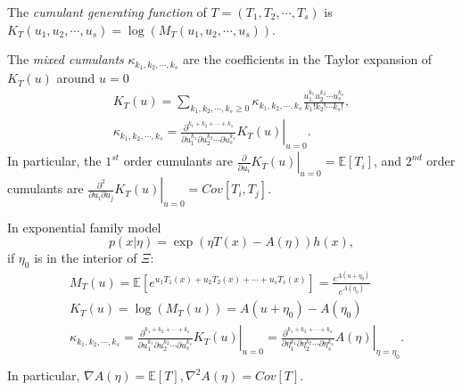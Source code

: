\documentclass[a4paper]{article}
\begin{document}
\begin{defi}
	The \emph{cumulant generating function} of $T = (T_1,T_2, \cdots, T_s)$ is $K_T(u_1, u_2, \cdots, u_s) = \log(M_T(u_1, u_2, \cdots, u_s))$. 
\end{defi}

\begin{prop}
	The \emph{mixed cumulants} $\kappa_{k_1, k_2, \cdots, k_s}$ are the coefficients in the Taylor expansion of $K_T(u)$ around $u = 0$
	\begin{equation}
		\begin{aligned}
			K_T(u) = \sum\limits_{k_1, k_2, \cdots, k_s \geq 0} \kappa_{k_1, k_2, \cdots, k_s} \frac{u_1^{k_1} u_2^{k_2} \cdots u_s^{k_s}}{k_1! k_2! \cdots k_s!}, \\
			\kappa_{k_1, k_2, \cdots, k_s} = \left.\frac{\partial ^{k_1+k_2+\cdots+k_s}}{\partial u_1 ^{k_1}\partial u_2 ^{k_2}\cdots\partial u_s ^{k_s}} K_T(u) \right|_{u=0}.
		\end{aligned}
	\end{equation}
	In particular, the $1^{st}$ order cumulants are $\left.\frac{\partial}{\partial u_i} K_T(u) \right|_{u=0} = \mathbb{E}[T_i]$, and $2^{nd}$ order cumulants are $\left.\frac{\partial ^2}{\partial u_i \partial u_j} K_T(u) \right|_{u=0} = Cov[T_i, T_j]$.
\end{prop}

\begin{remark}
	In exponential family model
	\begin{equation*}
		p(x|\eta) = \exp(\eta T(x)-A(\eta))h(x),
	\end{equation*}
	if $\eta_0$ is in the interior of $\Xi$:
	\begin{equation}
		\begin{aligned}
			&M_T(u) = \mathbb{E}[e^{u_1 T_1(x) + u_2 T_2(x) + \cdots + u_s T_s(x)}] = \frac{e^{A(u + \eta_0)}}{e^{A(\eta_0)}} \\
			&K_T(u) = \log(M_T(u)) = A(u + \eta_0) - A(\eta_0) \\
			&\kappa_{k_1, k_2, \cdots, k_s} = \left.\frac{\partial ^{k_1+k_2+\cdots+k_s}}{\partial u_1 ^{k_1}\partial u_2 ^{k_2}\cdots\partial u_s ^{k_s}} K_T(u) \right|_{u=0} = \left.\frac{\partial ^{k_1+k_2+\cdots+k_s}}{\partial \eta_1 ^{k_1}\partial \eta_2 ^{k_2}\cdots\partial \eta_s ^{k_s}} A(\eta) \right|_{\eta=\eta_0}. \\
		\end{aligned}
	\end{equation}
	In particular, $\nabla A(\eta) = \mathbb{E}[T], \nabla^2 A(\eta) = Cov[T]$.
\end{remark}
\end{document}
